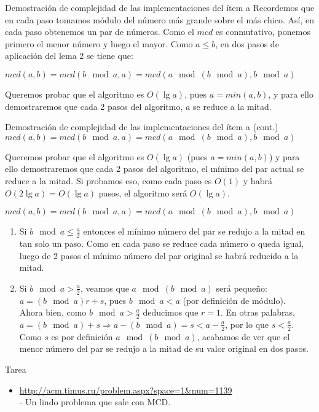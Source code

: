 \documentclass[compress]{beamer}
\newcommand{\tabu}{\hspace*{0.7cm}}
\begin{document}
\begin{frame}{Demostraci\'on de complejidad de las implementaciones del \'item a}
Recordemos que en cada paso tomamos m\'odulo del n\'umero m\'as grande sobre el m\'as chico. As\'i, en cada paso obtenemos un par de n\'umeros. Como el $mcd$ es conmutativo, ponemos primero el menor n\'umero y luego el mayor. Como $a \leq b$, en dos pasos de aplicaci\'on del lema 2 se tiene que: \\ \bigskip

$mcd(a,b) = mcd(b \mod{a}, a) = mcd(a \mod{(b \mod{a})}, b \mod{a})$ \\ \bigskip

Queremos probar que el algoritmo es $O(\lg a)$, pues $a = min(a,b)$, y para ello demostraremos que cada 2 pasos del algoritmo, $a$ se reduce a la mitad.
\end{frame}

\begin{frame}{Demostraci\'on de complejidad de las implementaciones del \'item a (cont.)}
$mcd(a,b) = mcd(b \mod{a}, a) = mcd(a \mod{(b \mod{a})}, b \mod{a})$ \\ \bigskip

Queremos probar que el algoritmo es $O(\lg a)$ (pues $a = min(a,b)$) y para ello demostraremos que cada 2 pasos del algoritmo, el m\'inimo del par actual se reduce a la mitad. Si probamos eso, como cada paso es $O(1)$ y habr\'a $O(2\lg a) = O(\lg a)$ pasos, el algoritmo ser\'a $O(\lg a)$.\\ \bigskip

\end{frame}

\begin{frame}
$mcd(a,b) = mcd(b \mod{a}, a) = mcd(a \mod{(b \mod{a})}, b \mod{a})$ \\ \bigskip

\begin{enumerate}
\item Si $b \mod{a} \leq \frac{a}{2}$ entonces el m\'inimo n\'umero del par se redujo a la mitad en tan solo un paso. Como en cada paso se reduce cada n\'umero o queda igual, luego de 2 pasos el m\'inimo n\'umero del par original se habr\'a reducido a la mitad.
\item Si $b \mod{a} > \frac{a}{2}$, veamos que $a \mod{(b \mod{a})}$ ser\'a peque\~no: \\
\tabu \tabu $a = (b \mod{a})r + s$, pues $b \mod{a} < a$ (por definici\'on de m\'odulo). \\

Ahora bien, como $b \mod{a} > \frac{a}{2}$ deducimos que $r = 1$. En otras palabras, $a = (b \mod{a}) + s \Rightarrow a - (b \mod{a}) = s < a - \frac{a}{2}$, por lo que $s < \frac{a}{2}$. 
Como $s$ es por definici\'on $a \mod{(b \mod{a})}$, acabamos de ver que el menor n\'umero del par se redujo a la mitad de su valor original en dos pasos.
\end{enumerate}

\end{frame}

\begin{frame}{Tarea}
\begin{itemize}
\item {\small \url{http://acm.timus.ru/problem.aspx?space=1\&num=1139}} \\- Un lindo problema que sale con MCD.
\end{itemize}
\end{frame}
\end{document}
